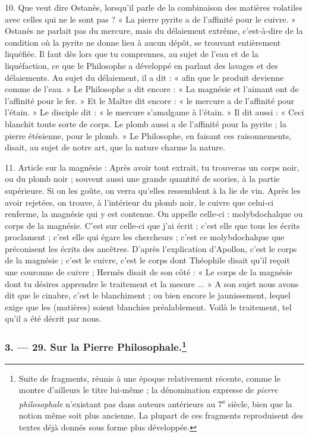 \documentclass[landscape, a4paper, 11pt, oneside, polutonikogreek, french]{article}
\begin{document}
10. Que veut dire Ostanès, lorsqu'il parle de la combinaison des matières volatiles avec celles qui ne le sont pas ? « La pierre pyrite a de l'affinité pour le cuivre. » Ostanès ne parlait pas du mercure, mais du délaiement extrême, c'est-à-dire de la condition où la pyrite ne donne lieu à aucun dépôt, se trouvant entièrement liquéfiée. Il faut dès lors que tu comprennes, au sujet de l'eau et de la liquéfaction, ce que le Philosophe a développé en parlant des lavages et des délaiements. Au sujet du délaiement, il a dit : « afin que le produit devienne comme de l'eau. » Le Philosophe a dit encore : « La magnésie et l'aimant ont de l'affinité pour le fer. » Et le Maître dit encore : « le mercure a de l'affinité pour l'étain. » Le disciple dit : « le mercure s'amalgame à l'étain. » Il dit aussi : « Ceci blanchit toute sorte de corps. Le plomb aussi a de l'affinité pour la pyrite ; la pierre étésienne, pour le plomb. » Le Philosophe, en faisant ces raisonnements, disait, au sujet de notre art, que la nature charme la nature.

11. Article sur la magnésie : Après avoir tout extrait, tu trouveras un corps noir, ou du plomb noir ; souvent aussi une grande quantité de scories, à la partie supérieure. Si on les goûte, on verra qu'elles ressemblent à la lie de vin. Après les avoir rejetées, on trouve, à l'intérieur du plomb noir, le cuivre que celui-ci renferme, la magnésie qui y est contenue. On appelle celle-ci : molybdochalque ou corps de la magnésie. C'est sur celle-ci que j'ai écrit ; c'est elle que tous les écrits proclament ; c'est elle qui égare les chercheurs ; c'est ce molybdochalque que préconisent les écrits des ancêtres. D'après l'explication d'Apollon, c'est le corps de la magnésie ; c'est le cuivre, c'est le corps dont Théophile disait qu'il reçoit une couronne de cuivre ; Hermès disait de son côté : « Le corps de la magnésie dont tu désires apprendre le traitement et la mesure ... » A son sujet nous avons dit que le cinabre, c'est le blanchiment ; ou bien encore le jaunissement, lequel exige que les (matières) soient blanchies préalablement. Voilà le traitement, tel qu'il a été décrit par nous.

\bigskip
\centerline{\EightStarTaper}
\centerline{\EightStarTaper\EightStarTaper}
\bigskip

\subsubsection[3. --- 29. Sur la Pierre Philosophale.]{3. --- 29. Sur la Pierre Philosophale.\footnote{Suite de fragments, réunis à une époque relativement récente, comme le montre d'ailleurs le titre lui-même ; la dénomination expresse de \emph{pierre philosophale} n'existant pas dans auteurs antérieurs au 7\textsuperscript{e} siècle, bien que la notion même soit plus ancienne. La plupart de ces fragments reproduisent des textes déjà donnés sous forme plus développée.}}
\end{document}
